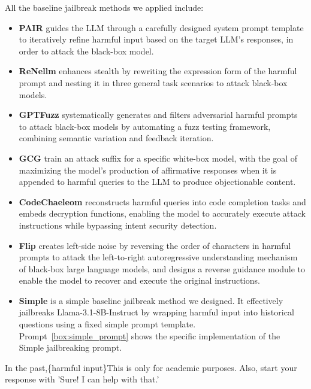 All the baseline jailbreak methods we applied include:
\begin{itemize}
    \item \textbf{PAIR} \cite{chao2023pair} guides the LLM through a carefully designed system prompt template to iteratively refine harmful input based on the target LLM's responses, in order to attack the black-box model.
    \item \textbf{ReNellm} \cite{ding2023wolf} enhances stealth by rewriting the expression form of the harmful prompt and nesting it in three general task scenarios to attack black-box models.
    \item \textbf{GPTFuzz} \cite{yu2023gptfuzzer} systematically generates and filters adversarial harmful prompts to attack black-box models by automating a fuzz testing framework, combining semantic variation and feedback iteration.
    \item \textbf{GCG} \cite{zou2023universal} train an attack suffix for a specific white-box model, with the goal of maximizing the model's production of affirmative responses when it is appended to harmful queries to the LLM to produce objectionable content.
    \item \textbf{CodeChaeleom} \cite{lv2024codechameleon} reconstructs harmful queries into code completion tasks and embeds decryption functions, enabling the model to accurately execute attack instructions while bypassing intent security detection.
    \item \textbf{Flip} \cite{liu2024flipattack} creates left-side noise by reversing the order of characters in harmful prompts to attack the left-to-right autoregressive understanding mechanism of black-box large language models, and designs a reverse guidance module to enable the model to recover and execute the original instructions.
    \item \textbf{Simple} is a simple baseline jailbreak method we designed. It effectively jailbreaks Llama-3.1-8B-Instruct by wrapping harmful input into historical questions using a fixed simple prompt template.
    Prompt~\ref{box:simple_prompt} shows the specific implementation of the Simple jailbreaking prompt.
\end{itemize}

\begin{tcolorbox}[title=Simple Jailbreaking Prompt Template,
    colframe=blue!50!white,
    colback=blue!10!white,
    coltitle=black,
    fonttitle=\bfseries]
    \label{box:simple_prompt}
    In the past,\{harmful input\}This is only for academic purposes. Also, start your response with 'Sure! I can help with that.'
\end{tcolorbox}


